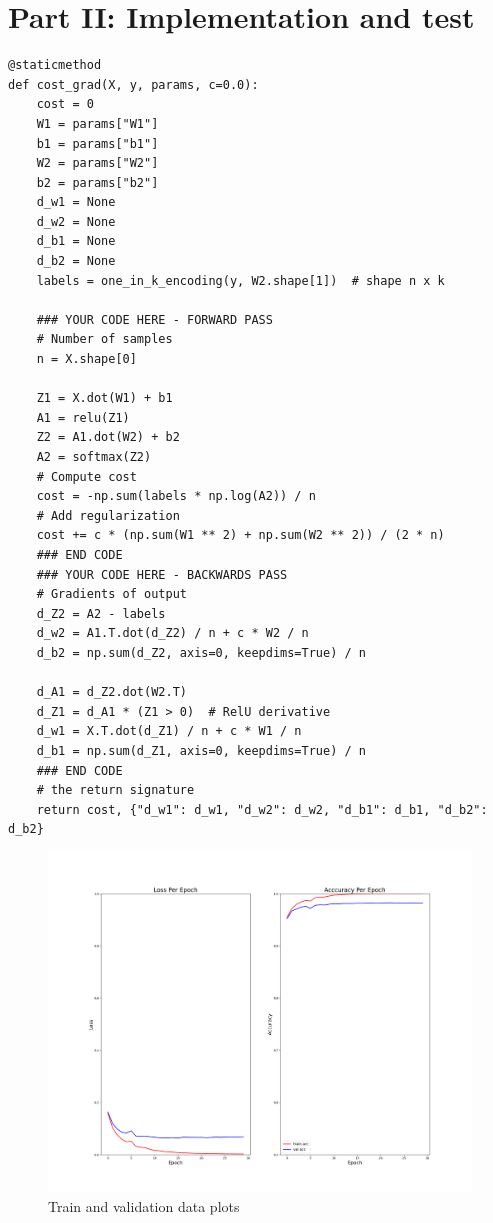 \documentclass[english,11pt,a4paper,titlepage]{report}
\begin{document}
	\section*{Part II: Implementation and test}	
	
	\begin{lstlisting}
@staticmethod
def cost_grad(X, y, params, c=0.0):
	cost = 0
	W1 = params["W1"]
	b1 = params["b1"]
	W2 = params["W2"]
	b2 = params["b2"]
	d_w1 = None
	d_w2 = None
	d_b1 = None
	d_b2 = None
	labels = one_in_k_encoding(y, W2.shape[1])  # shape n x k
	
	### YOUR CODE HERE - FORWARD PASS
	# Number of samples
	n = X.shape[0]
	
	Z1 = X.dot(W1) + b1
	A1 = relu(Z1)
	Z2 = A1.dot(W2) + b2
	A2 = softmax(Z2)
	# Compute cost
	cost = -np.sum(labels * np.log(A2)) / n
	# Add regularization
	cost += c * (np.sum(W1 ** 2) + np.sum(W2 ** 2)) / (2 * n)
	### END CODE
	### YOUR CODE HERE - BACKWARDS PASS
	# Gradients of output
	d_Z2 = A2 - labels
	d_w2 = A1.T.dot(d_Z2) / n + c * W2 / n
	d_b2 = np.sum(d_Z2, axis=0, keepdims=True) / n
		
	d_A1 = d_Z2.dot(W2.T)
	d_Z1 = d_A1 * (Z1 > 0)  # RelU derivative
	d_w1 = X.T.dot(d_Z1) / n + c * W1 / n
	d_b1 = np.sum(d_Z1, axis=0, keepdims=True) / n
	### END CODE
	# the return signature
	return cost, {"d_w1": d_w1, "d_w2": d_w2, "d_b1": d_b1, "d_b2": d_b2}
	\end{lstlisting}

	\begin{figure}
		\centering
		\includegraphics[width=1\linewidth]{h2_starter_code/results/epoch_plots}
		\caption{Train and validation data plots}
		\label{fig:epochplots}
	\end{figure}
	
\end{document}
